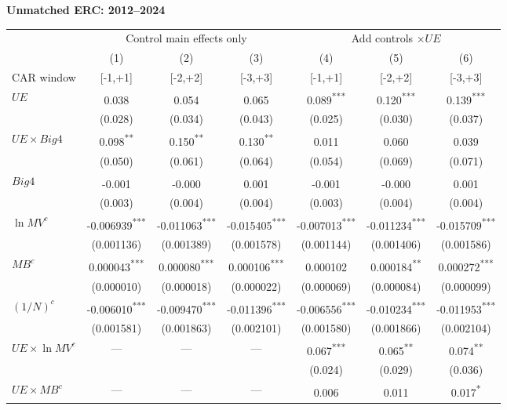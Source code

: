 \documentclass[10pt]{article}
\newcommand{\sym}[1]{\textsuperscript{#1}}
\begin{document}
\noindent\textbf{Unmatched ERC: 2012--2024}\par\medskip
\setlength{\tabcolsep}{4pt}\renewcommand{\arraystretch}{1.12}
\noindent\begin{tabular*}{\textwidth}{@{\extracolsep{\fill}}lcccccc@{}}\toprule
 & \multicolumn{3}{c}{Control main effects only} & \multicolumn{3}{c}{Add controls \(\times UE\)} \\
\cmidrule(lr){2-4}\cmidrule(lr){5-7}
 & (1) & (2) & (3) & (4) & (5) & (6) \\
CAR window & [-1,+1] & [-2,+2] & [-3,+3] & [-1,+1] & [-2,+2] & [-3,+3] \\\midrule
\(UE\) & 0.038\sym{} & 0.054\sym{} & 0.065\sym{} & 0.089\sym{***} & 0.120\sym{***} & 0.139\sym{***} \\
 & (0.028) & (0.034) & (0.043) & (0.025) & (0.030) & (0.037) \\
\(UE\times Big4\) & 0.098\sym{**} & 0.150\sym{**} & 0.130\sym{**} & 0.011\sym{} & 0.060\sym{} & 0.039\sym{} \\
 & (0.050) & (0.061) & (0.064) & (0.054) & (0.069) & (0.071) \\
\(Big4\) & -0.001\sym{} & -0.000\sym{} & 0.001\sym{} & -0.001\sym{} & -0.000\sym{} & 0.001\sym{} \\
 & (0.003) & (0.004) & (0.004) & (0.003) & (0.004) & (0.004) \\
\(\ln MV^c\) & -0.006939\sym{***} & -0.011063\sym{***} & -0.015405\sym{***} & -0.007013\sym{***} & -0.011234\sym{***} & -0.015709\sym{***} \\
 & (0.001136) & (0.001389) & (0.001578) & (0.001144) & (0.001406) & (0.001586) \\
\(MB^c\) & 0.000043\sym{***} & 0.000080\sym{***} & 0.000106\sym{***} & 0.000102\sym{} & 0.000184\sym{**} & 0.000272\sym{***} \\
 & (0.000010) & (0.000018) & (0.000022) & (0.000069) & (0.000084) & (0.000099) \\
\((1/N)^c\) & -0.006010\sym{***} & -0.009470\sym{***} & -0.011396\sym{***} & -0.006556\sym{***} & -0.010234\sym{***} & -0.011953\sym{***} \\
 & (0.001581) & (0.001863) & (0.002101) & (0.001580) & (0.001866) & (0.002104) \\
\(UE\times\ln MV^c\) & --- & --- & --- & 0.067\sym{***} & 0.065\sym{**} & 0.074\sym{**} \\
 &  &  &  & (0.024) & (0.029) & (0.036) \\
\(UE\times MB^c\) & --- & --- & --- & 0.006\sym{} & 0.011\sym{} & 0.017\sym{*} \\

\end{tabular*}
\end{document}
